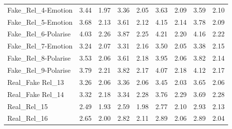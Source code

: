 \documentclass[empirical, authordate]{jote-new-article}
\begin{document}
\begin{table}
\begin{tabularx}{\linewidth}{@{} X  S  S  S  S | S  S  S  S@{}}
    Fake\_Rel\_4-Emotion   & 3.44                                           & 1.97                                         & 3.36           & 2.05            & 3.63          & 2.09           & 3.59           & 2.10            \\
    Fake\_Rel\_5-Emotion   & 3.68                                           & 2.13                                         & 3.61           & 2.12            & 4.15          & 2.14           & 3.78           & 2.09            \\
    Fake\_Rel\_6-Polarise  & 4.03                                           & 2.26                                         & 3.87           & 2.25            & 4.21          & 2.20           & 4.16           & 2.22            \\
    Fake\_Rel\_7-Emotion   & 3.24                                           & 2.07                                         & 3.31           & 2.16            & 3.50          & 2.05           & 3.38           & 2.15            \\
    Fake\_Rel\_8-Polarise  & 3.53                                           & 2.06                                         & 3.61           & 2.18            & 3.95          & 2.06           & 3.82           & 2.14            \\
    Fake\_Rel\_9-Polarise  & 3.79                                           & 2.21                                         & 3.82           & 2.17            & 4.07          & 2.18           & 4.12           & 2.17            \\
    Real\_Fake Rel\_13     & 3.26                                           & 2.06                                         & 3.36           & 2.06            & 3.45          & 2.03           & 3.65           & 2.06            \\
    Real\_Fake Rel\_14     & 3.32                                           & 2.18                                         & 3.34           & 2.28            & 3.76          & 2.29           & 3.69           & 2.28            \\
    Real\_Rel\_15          & 2.49                                           & 1.93                                         & 2.59           & 1.98            & 2.77          & 2.10           & 2.93           & 2.13            \\
    Real\_Rel\_16          & 2.65                                           & 2.00                                         & 2.82           & 2.11            & 2.89          & 2.06           & 2.89           & 2.04            \\
    \bottomrule
  \end{tabularx}


\end{table}
\end{document}
